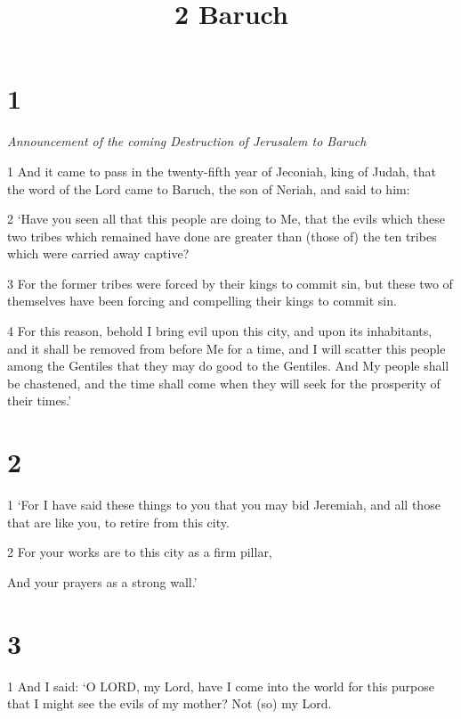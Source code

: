 

\title{2 Baruch}

\chapter{1}

\par \textit{Announcement of the coming Destruction of Jerusalem to Baruch}

\par 1 And it came to pass in the twenty-fifth year of Jeconiah, king of Judah, that the word of the Lord came to Baruch, the son of Neriah, and said to him: 

\par 2 ‘Have you seen all that this people are doing to Me, that the evils which these two tribes which remained have done are greater than (those of) the ten tribes which were carried away captive? 

\par 3 For the former tribes were forced by their kings to commit sin, but these two of themselves have been forcing and compelling their kings to commit sin. 

\par 4 For this reason, behold I bring evil upon this city, and upon its inhabitants, and it shall be removed from before Me for a time, and I will scatter this people among the Gentiles that they may do good to the Gentiles. And My people shall be chastened, and the time shall come when they will seek for the prosperity of their times.’

\chapter{2}

\par 1 ‘For I have said these things to you that you may bid Jeremiah, and all those that are like you, to retire from this city.

\par 2 For your works are to this city as a firm pillar,

\par And your prayers as a strong wall.’

\chapter{3}

\par 1 And I said: ‘O LORD, my Lord, have I come into the world for this purpose that I might see the evils of my mother? Not (so) my Lord. 

